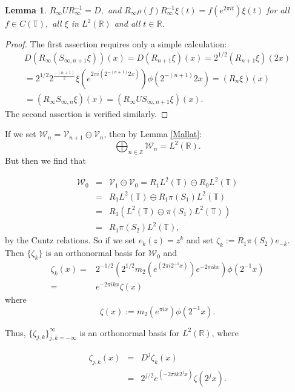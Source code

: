 \documentclass{amsproc}
\theoremstyle{plain}
\theoremstyle{definition}
\theoremstyle{definition}
\theoremstyle{remark}
\theoremstyle{plain}
\newtheorem{lem}[thm]{Lemma}
\begin{document}
\begin{lem}
$R_{\infty}UR_{\infty}^{-1}=D,$ and
$R_{\infty}\rho(f)R_{\infty}^{-1}\xi(t)=f(e^{2\pi it})\xi(t)$
for all $f\in C(\mathbb{T}),$ all $\xi$ in $L^{2}(\mathbb{R})$
and all $t\in\mathbb{R}$. 
\end{lem}
\begin{proof}
The first assertion requires only a simple calculation:\begin{multline*}
D(R_{\infty}(S_{\infty,n+1}\xi))(x)=D(R_{n+1}\xi)(x)=2^{1/2}(R_{n+1}\xi)(2x)\\
=2^{1/2}2^{\frac{-(n+1)}{2}}\xi(e^{2\pi
i(2^{-(n+1)}2x)})\phi(2^{-(n+1)}2x)=(R_{n}\xi)(x)\\
=(R_{\infty}S_{\infty,n}\xi)(x)=(R_{\infty}US_{\infty,n+1}\xi)(x).
\end{multline*}
 The second assertion is verified similarly.
\end{proof}
\noindent If we set $\mathcal{W}_{n}=\mathcal{V}_{n+1}\ominus\mathcal{V}_{n}$,
then by Lemma \ref{Mallat}:\[
\bigoplus_{n\in\mathbb{Z}}\mathcal{W}_{n}=L^{2}(\mathbb{R}).\]
 But then we find that

\noindent \begin{eqnarray}
\mathcal{W}_{0} & = &
\mathcal{V}_{1}\ominus\mathcal{V}_{0}=R_{1}L^{2}(\mathbb{T})\ominus
R_{0}L^{2}(\mathbb{T})\label{eq:Wzero}\\
 & = & R_{1}L^{2}(\mathbb{T})\ominus R_{1}\pi(S_{1})L^{2}(\mathbb{T})\nonumber
\\
 & = & R_{1}(L^{2}(\mathbb{T})\ominus\pi(S_{1})L^{2}(\mathbb{T}))\nonumber \\
 & = & R_{1}\pi(S_{2})L^{2}(\mathbb{T}),\nonumber \end{eqnarray}
by the Cuntz relations. So if we set $e_{k}(z)=z^{k}$ and set
$\zeta_{k}:=R_{1}\pi(S_{2})e_{-k}$.
Then $\{\zeta_{k}\}$ is an orthonormal basis for $\mathcal{W}_{0}$
and \begin{eqnarray*}
\zeta_{k}(x)= & 2^{-1/2}(2^{1/2}m_{2}(e^{(2\pi i2^{-1}x)})e^{-2\pi
ikx})\phi(2^{-1}x)\\
= & e^{-2\pi ikx}\zeta(x)\end{eqnarray*}
where \[
\zeta(x):=m_{2}(e^{\pi ix})\phi(2^{-1}x).\]


\noindent Thus, $\{\zeta_{j,k}\}_{j,k=-\infty}^{\infty}$ is an orthonormal
basis for $L^{2}(\mathbb{R})$, where

\begin{eqnarray*}
\zeta_{j,k}(x) & = & D^{j}\zeta_{k}(x)\\
 & = & 2^{j/2}e^{(-2\pi ik2^{j}x)}\zeta(2^{j}x).\end{eqnarray*}
\end{document}

